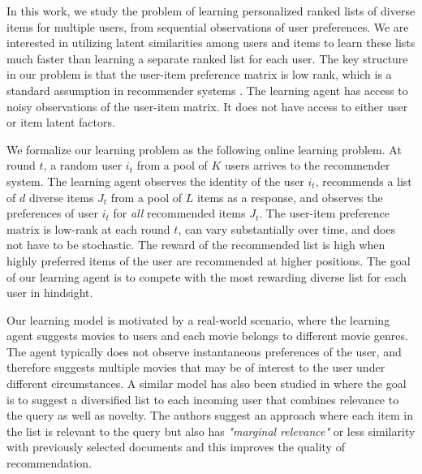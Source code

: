 
In this work, we study the problem of learning personalized ranked lists of diverse items for multiple users, from sequential observations of user preferences. We are interested in utilizing latent similarities among users and items to learn these lists much faster than learning a separate ranked list for each user. The key structure in our problem is that the user-item preference matrix is low rank, which is a standard assumption in recommender systems \citep{koren2009matrix,ricci2011liorrokach}. The learning agent has access to noisy observations of the user-item matrix. It does not have access to either user or item latent factors.

We formalize our learning problem as the following online learning problem. At round $t$, a random user $i_t$ from a pool of $K$ users arrives to the recommender system. The learning agent observes the identity of the user $i_t$, recommends a list of $d$ diverse items $J_t$ from a pool of $L$ items as a response, and observes the preferences of user $i_t$ for \textit{all} recommended items $J_t$. The user-item preference matrix is low-rank at each round $t$, can vary substantially over time, and does not have to be stochastic. The reward of the recommended list is high when highly preferred items of the user are recommended at higher positions. The goal of our learning agent is to compete with the most rewarding diverse list for each user in hindsight.

Our learning model is motivated by a real-world scenario, where the learning agent suggests movies to users and each movie belongs to different movie genres. The agent typically does not observe instantaneous preferences of the user, and therefore suggests multiple movies that may be of interest to the user under different circumstances. A similar model has also been studied in \citet{carbonell1998use} where the goal is to suggest a diversified list to each incoming user that combines relevance to the query as well as novelty. The authors suggest an approach where each item in the list is relevant to the query but also has \textit{"marginal relevance"} or less similarity with previously selected documents and this improves the quality of recommendation.


%


